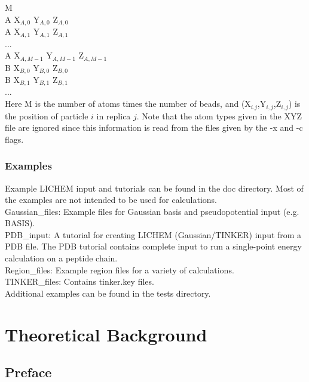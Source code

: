 \documentclass[12pt]{report}
\begin{document}
M \\

A  X$_{A,0}$  Y$_{A,0}$  Z$_{A,0}$ \\
A  X$_{A,1}$  Y$_{A,1}$  Z$_{A,1}$ \\
... \\
A  X$_{A,M-1}$  Y$_{A,M-1}$  Z$_{A,M-1}$ \\
B  X$_{B,0}$  Y$_{B,0}$  Z$_{B,0}$ \\
B  X$_{B,1}$  Y$_{B,1}$  Z$_{B,1}$ \\
... \\

Here M is the number of atoms times the number of beads, and
(X$_{i.j}$,Y$_{i,j}$,Z$_{i,j}$) is the position of particle $i$ in replica
$j$.
Note that the atom types given in the XYZ file are ignored since this
information is read from the files given by the -x and -c flags.

\subsection{Examples}

Example LICHEM input and tutorials can be found in the doc directory.
Most of the examples are not intended to be used for calculations. \\

Gaussian\_files: Example files for Gaussian basis and pseudopotential
input (e.g. BASIS). \\

PDB\_input: A tutorial for creating LICHEM (Gaussian/TINKER) input from a
PDB file.
The PDB tutorial contains complete input to run a single-point energy
calculation on a peptide chain. \\

Region\_files: Example region files for a variety of calculations. \\

TINKER\_files: Contains tinker.key files. \\

Additional examples can be found in the tests directory.

\chapter{Theoretical Background}
\label{chap:Theory}

\section{Preface}
\end{document}

